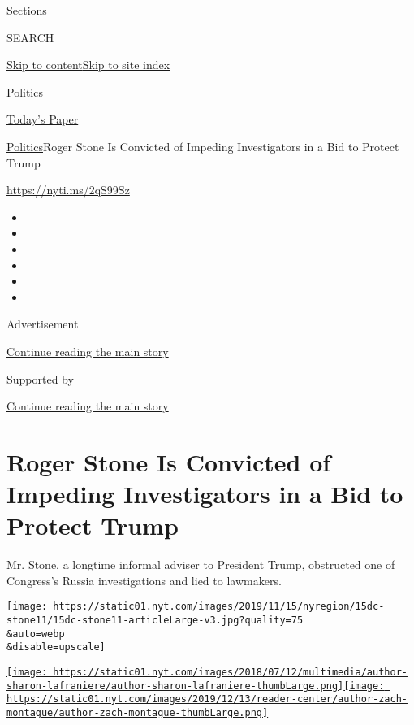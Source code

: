 Sections

SEARCH

\protect\hyperlink{site-content}{Skip to
content}\protect\hyperlink{site-index}{Skip to site index}

\href{https://www.nytimes.com/section/politics}{Politics}

\href{https://myaccount.nytimes.com/auth/login?response_type=cookie\&client_id=vi}{}

\href{https://www.nytimes.com/section/todayspaper}{Today's Paper}

\href{/section/politics}{Politics}\textbar{}Roger Stone Is Convicted of
Impeding Investigators in a Bid to Protect Trump

\url{https://nyti.ms/2qS99Sz}

\begin{itemize}
\item
\item
\item
\item
\item
\item
\end{itemize}

Advertisement

\protect\hyperlink{after-top}{Continue reading the main story}

Supported by

\protect\hyperlink{after-sponsor}{Continue reading the main story}

\hypertarget{roger-stone-is-convicted-of-impeding-investigators-in-a-bid-to-protect-trump}{%
\section{Roger Stone Is Convicted of Impeding Investigators in a Bid to
Protect
Trump}\label{roger-stone-is-convicted-of-impeding-investigators-in-a-bid-to-protect-trump}}

Mr. Stone, a longtime informal adviser to President Trump, obstructed
one of Congress's Russia investigations and lied to lawmakers.

\texttt{[image: https://static01.nyt.com/images/2019/11/15/nyregion/15dc-stone11/15dc-stone11-articleLarge-v3.jpg?quality=75\\\&auto=webp\\\&disable=upscale]}

\href{https://www.nytimes.com/by/sharon-lafraniere}{\texttt{[image: https://static01.nyt.com/images/2018/07/12/multimedia/author-sharon-lafraniere/author-sharon-lafraniere-thumbLarge.png]}}\href{https://www.nytimes.com/by/zach-montague}{\texttt{[image: https://static01.nyt.com/images/2019/12/13/reader-center/author-zach-montague/author-zach-montague-thumbLarge.png]}}

